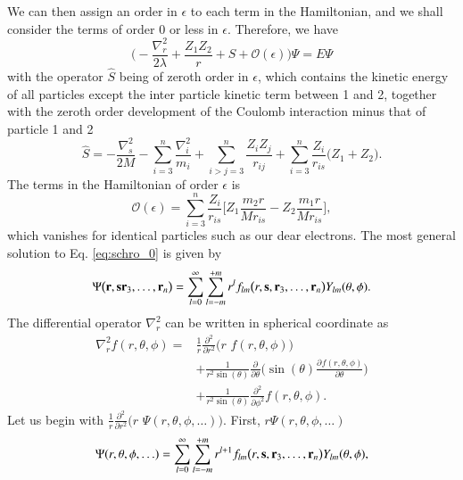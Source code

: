 \documentclass[aip,jcp,reprint,noshowkeys,superscriptaddress]{revtex4-1}
\newcommand{\deriv}[3]{\frac{\partial^{#3} #1}{\partial {#2}^{#3}}}
\newcommand{\bd}[1]{{\bf {#1}}}
\newcommand{\br}[0]{{\bf {r}}}
\newcommand{\bs}[0]{{\bf {s}}}
\begin{document}
We can then assign an order in $\epsilon$ to each term in the Hamiltonian, and we shall consider the terms of order 0 or less in $\epsilon$. 
Therefore, we have 
\begin{equation}
 \label{eq:schro_0}
 \bigg( - \frac{\nabla_r^2}{2\lambda} + \frac{Z_1 Z_2}{r} + \hat{S} + \mathcal{O}(\epsilon) \bigg) \Psi = E \Psi
\end{equation}
with the operator $\hat{S}$ being of zeroth order in $\epsilon$, which contains the kinetic energy of all particles except the inter particle kinetic term between 1 and 2, together with the zeroth order development of the Coulomb interaction minus that of particle 1 and 2
\begin{equation}
 \hat{S} = -\frac{\nabla_{s}^2}{2 M}  - \sum_{i=3}^n \frac{\nabla_i^2}{m_i}  + \sum_{i>j=3}^n \frac{Z_i Z_j}{r_{ij}} 
 + \sum_{i=3}^n \frac{Z_i}{r_{is}} \big( Z_1+Z_2 \big). 
\end{equation}
The terms in the Hamiltonian of order $\epsilon$ is 
\begin{equation}
 \mathcal{O}(\epsilon) = \sum_{i=3}^n \frac{Z_i}{r_{is}} \bigg[Z_1 \frac{m_2 r}{Mr_{is}}-Z_2 \frac{m_1 r}{Mr_{is}}\bigg],
\end{equation}
which vanishes for identical particles such as our dear electrons. 
The most general solution to Eq. \eqref{eq:schro_0} is given by 
\begin{equation}
 \label{eq:psi_gen}
 \Psi\big(\br,\bs \bd{r}_3, \hdots ,\bd{r}_n\big) = \sum_{l=0}^{\infty} \sum_{l=-m}^{+m} 
 r^l f_{lm}\big(r,\bs,\bd{r}_3, \hdots ,\bd{r}_n\big) Y_{lm}(\theta,\phi). 
\end{equation}
The differential operator $\nabla_r^2$ can be written in spherical coordinate as
\begin{equation}
 \begin{aligned}
 \nabla_r^2 f(r,\theta,\phi) = & \frac{1}{r} \deriv{}{r}{2} \bigg( r\,\, f(r,\theta,\phi) \bigg) \\
  &+ \frac{1}{r^2 \sin(\theta)}  \deriv{}{\theta}{} \bigg(\sin(\theta) \deriv{f(r,\theta,\phi)}{\theta}{} \bigg) \\
  &+ \frac{1}{r^2 \sin(\theta)}  \deriv{}{\phi}{2} f(r,\theta,\phi). 
 \end{aligned}
\end{equation}
Let us begin with $\frac{1}{r} \deriv{}{r}{2} \bigg( r\,\, \Psi(r,\theta,\phi,\hdots) \bigg)$.
First, $r\Psi(r,\theta,\phi,\hdots)$
\begin{equation}
 \Psi(r,\theta,\phi,\hdots) = \sum_{l=0}^{\infty} \sum_{l=-m}^{+m} r^{l+1}f_{lm}\big(r,\bs,\bd{r}_3, \hdots ,\bd{r}_n\big) Y_{lm}(\theta,\phi),
\end{equation}
\end{document}
